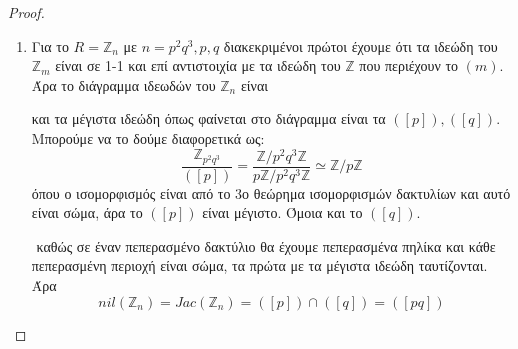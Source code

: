 \documentclass[oneside,a4paper]{article}
\newcommand{\Z}{\mathbb{Z}}
\begin{document}
\begin{proof}
\begin{enumerate}
		\item Για το $R=\Z_n$ με $n = p^2 q^3, p,q$ διακεκριμένοι πρώτοι έχουμε ότι τα ιδεώδη του $\Z_m$ είναι σε 1-1 και επί αντιστοιχία με τα ιδεώδη του $\Z$ που περιέχουν το $(m)$. Άρα το διάγραμμα ιδεωδών του $\Z_n$ είναι
		\begin{center}
\end{center}

και τα μέγιστα ιδεώδη όπως φαίνεται στο διάγραμμα είναι τα $([p]),([q])$. Μπορούμε να το δούμε διαφορετικά ως:
$$\frac{\Z_{p^2 q^3}}{([p])} = \frac{\Z / p^2q^3\Z }{p\Z / p^2q^3 \Z} \simeq \Z / p\Z$$
όπου ο ισομορφισμός είναι από το 3ο θεώρημα ισομορφισμών δακτυλίων και αυτό είναι σώμα, άρα το $([p])$ είναι μέγιστο. Όμοια και το $([q])$.

$ $\newline
καθώς σε έναν πεπερασμένο δακτύλιο θα έχουμε πεπερασμένα πηλίκα και κάθε πεπερασμένη περιοχή είναι σώμα, τα πρώτα με τα μέγιστα ιδεώδη ταυτίζονται. Άρα
$$nil(\Z_n) = Jac(\Z_n) = ([p])\cap ([q]) = ([pq])$$



\end{enumerate}
\end{proof}
\end{document}
